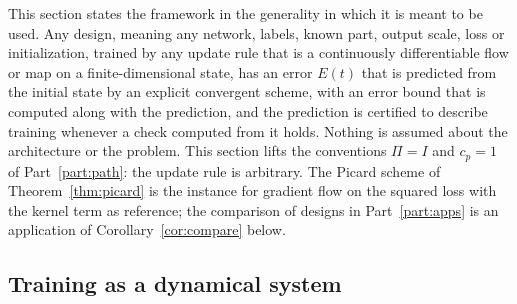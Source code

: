 \documentclass[11pt]{article}
\theoremstyle{definition}
\theoremstyle{remark}
\begin{document}
This section states the framework in the generality in which it is meant to be used.
Any design, meaning any network, labels, known part, output scale, loss or initialization, trained by any update rule that is a continuously differentiable flow or map on a finite-dimensional state, has an error $E(t)$ that is predicted from the initial state by an explicit convergent scheme, with an error bound that is computed along with the prediction, and the prediction is certified to describe training whenever a check computed from it holds.
Nothing is assumed about the architecture or the problem.
This section lifts the conventions $\Pi = I$ and $c_p = 1$ of Part~\ref{part:path}: the update rule is arbitrary.
The Picard scheme of Theorem~\ref{thm:picard} is the instance for gradient flow on the squared loss with the kernel term as reference; the comparison of designs in Part~\ref{part:apps} is an application of Corollary~\ref{cor:compare} below.

\subsection{Training as a dynamical system}
\end{document}
